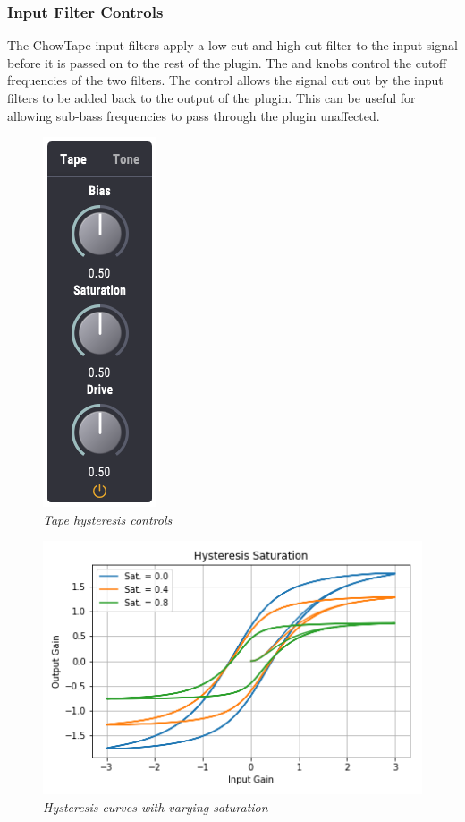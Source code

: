 \documentclass[landscape,twocolumn,a5paper]{manual}
\begin{document}
\subsubsection{Input Filter Controls}
The ChowTape input filters apply a low-cut and high-cut filter
to the input signal before it is passed on to the rest of the
plugin. The  and  knobs
control the cutoff frequencies of the two filters. The
 control allows the signal cut out by the
input filters to be added back to the output of the plugin.
This can be useful for allowing sub-bass frequencies to pass
through the plugin unaffected.

\begin{figure}[ht]
    \center
    \includegraphics[height=0.35\paperheight]{../Plugin/Screenshots/Tape.png}
    \caption{\label{h_bias}{\it Tape hysteresis controls}}
\end{figure}
%
%
\begin{figure}[ht]
    \center
    \includegraphics[width=0.85\columnwidth]{../Simulations/Hysteresis/sat.png}
    \caption{\label{h_sat}{\it Hysteresis curves with varying saturation}}
\end{figure}
\end{document}
